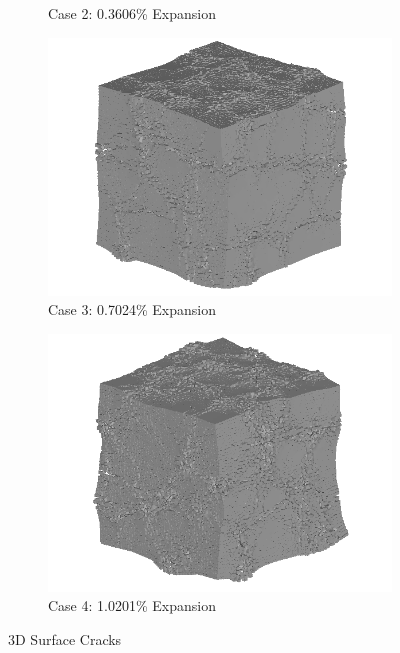 \begin{figure}[!h]
\begin{subfigure}{.5\textwidth}
    \caption{Case 2: 0.3606\% Expansion}
    \end{subfigure}%
    \begin{subfigure}{.5\textwidth}
      \centering
      \includegraphics[width=.8\linewidth]{Files/exp_3D/ASR/A30P25_3_3d.png}
    \caption{Case 3: 0.7024\% Expansion}
    \end{subfigure}
    \begin{subfigure}{.5\textwidth}
      \centering
      \includegraphics[width=.8\linewidth]{Files/exp_3D/ASR/A30P25_4_3d.png}
    \caption{Case 4: 1.0201\% Expansion}
    \end{subfigure}%


  \caption{3D Surface Cracks}
  \label{fig:ASR_A30P25_3D}
\end{figure}

